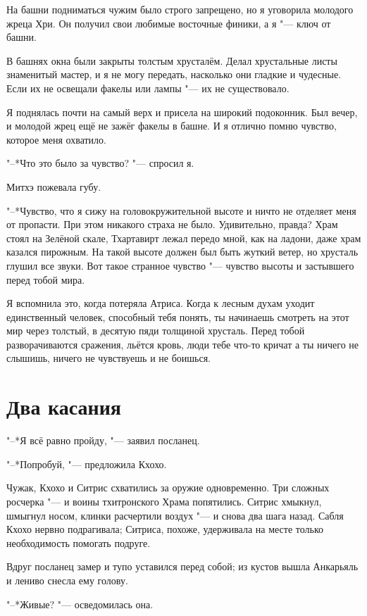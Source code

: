 \documentclass[a4paper,10pt]{book}
\newcommand{\ldotst}{\so{...}\xspace}
\begin{document}
На башни подниматься чужим было строго запрещено, но я уговорила молодого жреца 
Хри. Он получил свои любимые восточные финики, а я "--- ключ от башни.

В башнях окна были закрыты толстым хрусталём. Делал хрустальные листы 
знаменитый мастер, и я не могу передать, насколько они гладкие и чудесные. Если 
их не освещали факелы или лампы "--- их не существовало.

Я поднялась почти на самый верх и присела на широкий подоконник. Был вечер, и 
молодой жрец ещё не зажёг факелы в башне. И я отлично помню чувство, которое 
меня охватило. 

"--*Что это было за чувство? "--- спросил я.

Митхэ пожевала губу.

"--*Чувство, что я сижу на головокружительной высоте и ничто не отделяет меня 
от пропасти. При этом никакого страха не было. Удивительно, правда? Храм стоял 
на Зелёной скале, Тхартавирт лежал передо мной, как на ладони, даже храм 
казался пирожным. На такой высоте должен был быть жуткий ветер, но хрусталь 
глушил все звуки. Вот такое странное чувство "--- чувство высоты и застывшего 
перед тобой мира.

Я вспомнила это, когда потеряла Атриса. Когда к лесным духам уходит 
единственный человек, способный тебя понять, ты начинаешь смотреть на этот мир 
через толстый, в десятую пяди толщиной хрусталь. Перед тобой разворачиваются 
сражения, льётся кровь, люди тебе что-то кричат\ldotst а ты ничего не слышишь, 
ничего не чувствуешь и не боишься.

\section{Два касания}

"--*Я всё равно пройду, "--- заявил посланец.

"--*Попробуй, "--- предложила Кхохо.

Чужак, Кхохо и Ситрис схватились за оружие одновременно. Три сложных росчерка 
"--- и воины тхитронского Храма попятились. Ситрис хмыкнул, шмыгнул носом, 
клинки расчертили воздух "--- и снова два шага назад. Сабля Кхохо нервно 
подрагивала; Ситриса, похоже, удерживала на месте только необходимость помогать 
подруге.

Вдруг посланец замер и тупо уставился перед собой; из кустов вышла Анкарьяль и 
лениво снесла ему голову.

"--*Живые? "--- осведомилась она.
\end{document}
